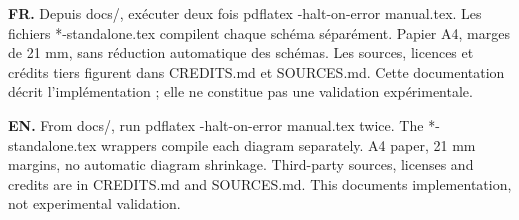 \documentclass[10pt,a4paper]{article}
\newcommand{\FR}[1]{\textbf{FR.} #1\par}\newcommand{\EN}[1]{{\selectlanguage{english}\textbf{EN.} #1\par}}
\begin{document}
\FR{Depuis docs/, exécuter deux fois pdflatex -halt-on-error manual.tex. Les fichiers *-standalone.tex compilent chaque schéma séparément. Papier A4, marges de 21 mm, sans réduction automatique des schémas. Les sources, licences et crédits tiers figurent dans CREDITS.md et SOURCES.md. Cette documentation décrit l’implémentation ; elle ne constitue pas une validation expérimentale.}
\EN{From docs/, run pdflatex -halt-on-error manual.tex twice. The *-standalone.tex wrappers compile each diagram separately. A4 paper, 21 mm margins, no automatic diagram shrinkage. Third-party sources, licenses and credits are in CREDITS.md and SOURCES.md. This documents implementation, not experimental validation.}
\end{document}
